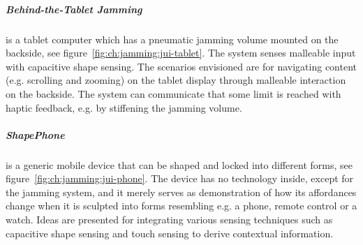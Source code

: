 \subparagraph{Behind-the-Tablet Jamming} is a tablet computer which has a pneumatic jamming volume mounted on the backside, see figure~\ref{fig:ch:jamming:jui-tablet}.
The system senses malleable input with capacitive shape sensing.
The scenarios envisioned are for navigating content (e.g. scrolling and zooming) on the tablet display through malleable interaction on the backside. 
The system can communicate that some limit is reached with haptic feedback, 
e.g. by stiffening the jamming volume.

\subparagraph{ShapePhone} is a generic mobile device that can be shaped and locked into different forms, see figure~\ref{fig:ch:jamming:jui-phone}.
The device has no technology inside, except for the jamming system, and it merely serves as demonstration of how its affordances change when it is sculpted into forms resembling e.g. a phone, remote control or a watch.
Ideas are presented for integrating various sensing techniques such as capacitive shape sensing and touch sensing to derive contextual information.


